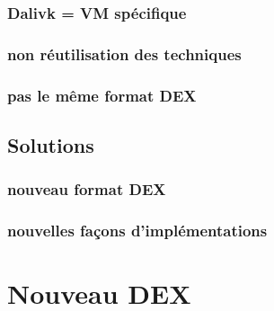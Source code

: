 \documentclass{sigplanconf}
\begin{document}
    \subsubsection{Dalivk = VM sp\'ecifique}
    \subsubsection{non r\'eutilisation des techniques}
    \subsubsection{pas le m\^eme format DEX}

  \subsection{Solutions}

    \subsubsection{nouveau format DEX}
    \subsubsection{nouvelles fa\c cons d'impl\'ementations}

\section{Nouveau DEX}
\end{document}
